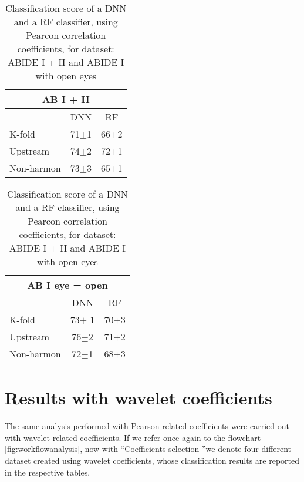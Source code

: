 \documentclass[11pt]{report}
\begin{document}
\begin{table}[h]
    \begin{subtable}[h]{0.45\textwidth}
        \centering
        \begin{tabular}{|lcc|}\toprule
        \multicolumn{3}{|c|}{AB I + II} \\\midrule
        &DNN &RF \\
        K-fold &71$\pm$1 &66+2 \\
        Upstream &74$\pm$2 &72+1 \\
        Non-harmon &73$\pm$3 &65+1 \\
        \bottomrule
        \end{tabular}
    \end{subtable}
   \begin{subtable}[h]{0.45\textwidth}
       \centering
       \begin{tabular}{|lcc|}\toprule
       \multicolumn{3}{|c|}{AB I eye = open} \\\midrule
       &DNN &RF \\
       K-fold &73$\pm$ 1 &70+3 \\
       Upstream &76$\pm$2 &71+2 \\
       Non-harmon &72$\pm$1 &68+3 \\
       \bottomrule
       \end{tabular}
    \end{subtable}
    \caption{Classification score of a DNN and a RF classifier, using Pearcon correlation coefficients, for dataset: ABIDE I + II and ABIDE I with open eyes}
    \label{tab:comparison_dnn_rf_pearson}
\end{table}


\newpage

\section{Results with wavelet coefficients}\label{sec:wavelet_results}

The same analysis performed with Pearson-related coefficients were carried out with wavelet-related coefficients. If we refer once again to the flowchart \ref{fig:workflowanalysis}, now with  \textquotedblleft Coefficients selection \textquotedblright we denote four different dataset created using wavelet coefficients, whose classification results are reported in the respective tables.
\end{document}

